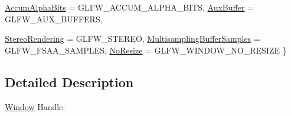 \begin{DoxyCompactItemize}
\hyperlink{namespace_f2_c_1_1_window_property_a89ec69d0a86f9d0063dfb69a3ebf3fbea8b9cf8f02ecf3600e1acbef746d18b22}{AccumAlphaBits} =  GLFW\_\-ACCUM\_\-ALPHA\_\-BITS, 
\hyperlink{namespace_f2_c_1_1_window_property_a89ec69d0a86f9d0063dfb69a3ebf3fbea88a5b2e774c2a1f6ae1e73147a5efb14}{AuxBuffer} =  GLFW\_\-AUX\_\-BUFFERS, 
\par
\hyperlink{namespace_f2_c_1_1_window_property_a89ec69d0a86f9d0063dfb69a3ebf3fbea4c44183de9d177c4983297940cdb3807}{StereoRendering} =  GLFW\_\-STEREO, 
\hyperlink{namespace_f2_c_1_1_window_property_a89ec69d0a86f9d0063dfb69a3ebf3fbeaf25fbd4a0c7fb8c62aeba61a1a4326f6}{MultisamplingBufferSamples} =  GLFW\_\-FSAA\_\-SAMPLES, 
\hyperlink{namespace_f2_c_1_1_window_property_a89ec69d0a86f9d0063dfb69a3ebf3fbea47495d245665347bbceb91f3c48f2fc9}{NoResize} =  GLFW\_\-WINDOW\_\-NO\_\-RESIZE
 \}
\end{DoxyCompactItemize}


\subsection{Detailed Description}
\hyperlink{class_f2_c_1_1_window}{Window} Handle. 

